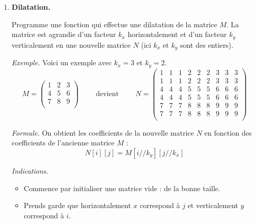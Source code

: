 \documentclass[11pt,class=report,crop=false]{standalone}
\begin{document}
\begin{activite}
	
	
	
\begin{enumerate}
	\item \textbf{Dilatation.}
	
	Programme une fonction  qui effectue une dilatation de la matrice $M$. La matrice est agrandie d'un facteur $k_x$ horizontalement et d'un facteur $k_y$ verticalement en une nouvelle matrice $N$ (ici $k_x$ et $k_y$ sont des entiers).
			
	\emph{Exemple.} Voici un exemple avec $k_x=3$ et $k_y=2$.
$$M = \begin{pmatrix}		
1 & 2 & 3 \\
4 & 5 & 6 \\
7 & 8 & 9 \\
\end{pmatrix} \qquad \text{ devient } \qquad
N = \begin{pmatrix}
1 & 1 & 1 & 2 & 2 & 2 & 3 & 3 & 3 \\
1 & 1 & 1 & 2 & 2 & 2 & 3 & 3 & 3 \\
4 & 4 & 4 & 5 & 5 & 5 & 6 & 6 & 6 \\
4 & 4 & 4 & 5 & 5 & 5 & 6 & 6 & 6 \\
7 & 7 & 7 & 8 & 8 & 8 & 9 & 9 & 9 \\
7 & 7 & 7 & 8 & 8 & 8 & 9 & 9 & 9 \\		
\end{pmatrix}$$

    \emph{Formule.}
    On obtient les coefficients de la nouvelle matrice $N$ en fonction des coefficients de l'ancienne matrice $M$ :
    $$N[i][j] = M[i//k_y][j//k_x]$$

	\emph{Indications.}
	\begin{itemize}
		\item Commence par initialiser une matrice vide :		
		de la bonne taille.
		
		\item Prends garde que horizontalement $x$ correspond à $j$ et verticalement $y$ correspond à $i$.
		
	\end{itemize}
		

\end{enumerate}
\end{activite}
\end{document}
